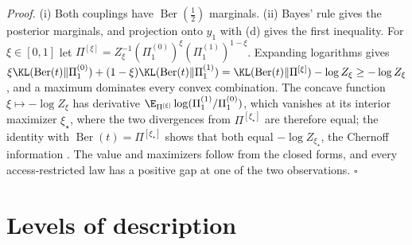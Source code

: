 \noindent\emph{Proof.}
(i) Both couplings have $\operatorname{Ber}(\tfrac12)$ marginals. (ii) Bayes' rule gives the posterior
marginals, and projection onto $y_1$ with (d) gives the first inequality. For
$\xi\in[0,1]$ let $\Pi^{[\xi]}=Z_\xi^{-1}(\Pi_1^{(0)})^\xi(\Pi_1^{(1)})^{1-\xi}$. Expanding logarithms gives
$\xi\KL(\operatorname{Ber}(t)\Vert\Pi_1^{(0)})+(1-\xi)\KL(\operatorname{Ber}(t)\Vert\Pi_1^{(1)})
=\KL(\operatorname{Ber}(t)\Vert\Pi^{[\xi]})-\log Z_\xi\geq-\log Z_\xi$, and a maximum dominates every convex
combination. The concave function $\xi\mapsto-\log Z_\xi$ has derivative
$\E_{\Pi^{[\xi]}}\log(\Pi_1^{(1)}/\Pi_1^{(0)})$, which vanishes at its interior maximizer $\xi_\star$, where
the two divergences from $\Pi^{[\xi_\star]}$ are therefore equal; the identity with
$\operatorname{Ber}(t)=\Pi^{[\xi_\star]}$ shows that both equal $-\log Z_{\xi_\star}$, the Chernoff
information \citep[Section~11.9]{CoverThomas2006}. The value and maximizers follow from the closed forms,
and every access-restricted law has a positive gap at one of the two observations. \hfill$\square$

\section{Levels of description}
\label{sec:prob-levels}

